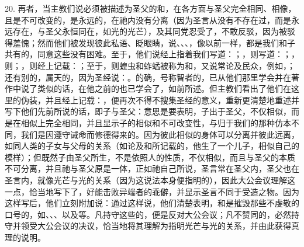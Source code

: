 20. 再者，当主教们说必须被描述为圣父的和，在各方面与圣父完全相同、相像，且是不可改变的，是永远的，在祂内没有分离（因为圣言从没有不存在过，而是永远存在，与圣父永恒同在，如光的光芒），及其同党忍受了，不敢反驳，因为被驳得羞愧；然而他们被发现彼此私语、眨眼睛，说、、、，像以前一样，都是我们和子共有的，同意这些没有困难。至于，他们说经上指着我们写道：；，则写道：；，则；，则经上记载：；至于，则蝗虫和蚱蜢被称为和，又说常论及民众，例如，；还有别的，属天的，因为圣经说：。的确，号称智者的，已从他们那里学会并在著作中说了类似的话，在他之前的也已学会了，如前所述。但主教们看出了他们在这里的伪装，并且经上记载：，便再次不得不搜集圣经的意义，重新更清楚地重述并写下他们先前所说的话，即子与圣父：意思是要表明，子出于圣父，不仅相似，而是在相似上完全相同，并且显示子的相似和不可改变性，与归于我们的那种仿本不同，我们是因遵守诫命而修德得来的。因为彼此相似的身体可以分离并彼此远离，如同人类的子女与父母的关系（如论及和所记载的，他生了一个儿子，相似自己的模样）；但既然子由圣父所生，不是依照人的性质，不仅相似，而且与圣父的本质不可分离，并且祂与圣父原是一体，正如祂自己所说，圣言常在圣父内，圣父也在圣言内，就像光芒与光的关系（因为这说法本身便指明的），因此大公会议理解这一点，恰当地写下了，好能击败异端者的乖僻，并显示圣言不同于受造之物。因为这样写后，他们立刻附加说：通过这样说，他们清楚表明，和是摧毁那些不虔敬的口号的，如、、、以及等。凡持守这些的，便是反对大公会议；凡不赞同的，必然持守并领受大公会议的决议，恰当地将其理解为指明光芒与光的关系，并由此获得真理的说明。\par

